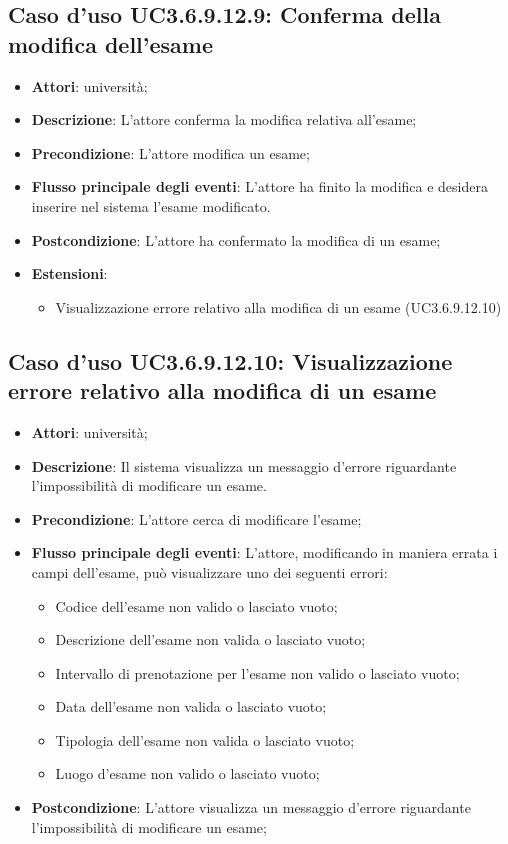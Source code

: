 \subsection{Caso d'uso \texorpdfstring{UC3.6.9.12.9}{UC3.6.9.12.9}: Conferma della modifica dell’esame}
\begin{itemize}
\item \textbf{Attori}: università;
\item \textbf{Descrizione}: L'attore conferma la modifica relativa all'esame;

\item \textbf{Precondizione}: L'attore modifica un esame;

\item \textbf{Flusso principale degli eventi}: L'attore ha finito la modifica e desidera inserire nel sistema l'esame modificato.

\item \textbf{Postcondizione}: L'attore ha confermato la modifica di un esame;

\item \textbf{Estensioni}:
\begin{itemize}
\item Visualizzazione errore relativo alla modifica di un esame (UC3.6.9.12.10)
\end{itemize}
\end{itemize}
\subsection{Caso d'uso \texorpdfstring{UC3.6.9.12.10}{UC3.6.9.12.10}: Visualizzazione errore relativo alla modifica di un esame}
\begin{itemize}
\item \textbf{Attori}: università;
\item \textbf{Descrizione}: Il sistema visualizza un messaggio d'errore riguardante l'impossibilità di modificare un esame.

\item \textbf{Precondizione}: L'attore cerca di modificare l'esame;

\item \textbf{Flusso principale degli eventi}: L'attore, modificando in maniera errata i campi dell'esame, può visualizzare uno dei seguenti errori: \begin{itemize} 
\item Codice dell’esame non valido o lasciato vuoto; 
\item Descrizione dell’esame non valida o lasciato vuoto; 
\item Intervallo di prenotazione per l’esame non valido o lasciato vuoto; 
\item Data dell’esame non valida o lasciato vuoto; 
\item Tipologia dell’esame non valida o lasciato vuoto; 
\item Luogo d’esame non valido o lasciato vuoto; 
\end{itemize}
\item \textbf{Postcondizione}: L'attore visualizza un messaggio d'errore riguardante l'impossibilità di modificare un esame;

\end{itemize}
